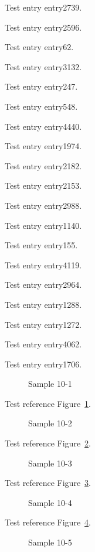Test entry \gls{entry2739}.

Test entry \gls{entry2596}.

Test entry \gls{entry62}.

Test entry \gls{entry3132}.

Test entry \gls{entry247}.

Test entry \gls{entry548}.

Test entry \gls{entry4440}.

Test entry \gls{entry1974}.

Test entry \gls{entry2182}.

Test entry \gls{entry2153}.

Test entry \gls{entry2988}.

Test entry \gls{entry1140}.

Test entry \gls{entry155}.

Test entry \gls{entry4119}.

Test entry \gls{entry2964}.

Test entry \gls{entry1288}.

Test entry \gls{entry1272}.

Test entry \gls{entry4062}.

Test entry \gls{entry1706}.

\begin{figure}[tbhp]
\caption{Sample 10-1}
\label{fig:sample-10-1}
\end{figure}

Test reference Figure~\ref{fig:sample-10-1}.

\begin{figure}[tbhp]
\caption{Sample 10-2}
\label{fig:sample-10-2}
\end{figure}

Test reference Figure~\ref{fig:sample-10-2}.

\begin{figure}[tbhp]
\caption{Sample 10-3}
\label{fig:sample-10-3}
\end{figure}

Test reference Figure~\ref{fig:sample-10-3}.

\begin{figure}[tbhp]
\caption{Sample 10-4}
\label{fig:sample-10-4}
\end{figure}

Test reference Figure~\ref{fig:sample-10-4}.

\begin{figure}[tbhp]
\caption{Sample 10-5}
\label{fig:sample-10-5}
\end{figure}

